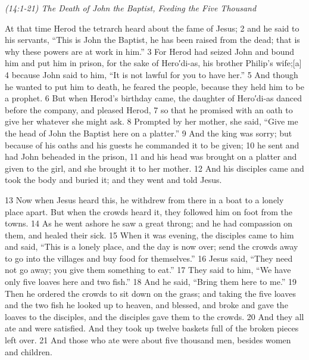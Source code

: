 \documentclass[letterpaper]{report}
\begin{document}
{\centering
	\emph{(14:1-21) The Death of John the Baptist,
		Feeding the Five Thousand}\\
}
\begin{multicols}{2}
At that time Herod the tetrarch heard about the fame of Jesus; 2 and he said to his servants, “This is John the Baptist, he has been raised from the dead; that is why these powers are at work in him.” 3 For Herod had seized John and bound him and put him in prison, for the sake of Hero′di-as, his brother Philip’s wife;[a] 4 because John said to him, “It is not lawful for you to have her.” 5 And though he wanted to put him to death, he feared the people, because they held him to be a prophet. 6 But when Herod’s birthday came, the daughter of Hero′di-as danced before the company, and pleased Herod, 7 so that he promised with an oath to give her whatever she might ask. 8 Prompted by her mother, she said, “Give me the head of John the Baptist here on a platter.” 9 And the king was sorry; but because of his oaths and his guests he commanded it to be given; 10 he sent and had John beheaded in the prison, 11 and his head was brought on a platter and given to the girl, and she brought it to her mother. 12 And his disciples came and took the body and buried it; and they went and told Jesus.

13 Now when Jesus heard this, he withdrew from there in a boat to a lonely place apart. But when the crowds heard it, they followed him on foot from the towns. 14 As he went ashore he saw a great throng; and he had compassion on them, and healed their sick. 15 When it was evening, the disciples came to him and said, “This is a lonely place, and the day is now over; send the crowds away to go into the villages and buy food for themselves.” 16 Jesus said, “They need not go away; you give them something to eat.” 17 They said to him, “We have only five loaves here and two fish.” 18 And he said, “Bring them here to me.” 19 Then he ordered the crowds to sit down on the grass; and taking the five loaves and the two fish he looked up to heaven, and blessed, and broke and gave the loaves to the disciples, and the disciples gave them to the crowds. 20 And they all ate and were satisfied. And they took up twelve baskets full of the broken pieces left over. 21 And those who ate were about five thousand men, besides women and children.
\end{multicols}
\end{document}
